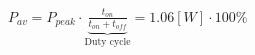 \documentclass[preview]{standalone}
\begin{document}
\begin{center}
$P_{av} = P_{peak} \cdot \underbrace{\frac{t_{on}}{t_{on}+t_{off}}}_{\text{Duty cycle}}=$$1.06 [W] \cdot 100 \%$
\end{center}
\end{document}
